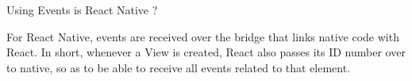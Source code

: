 Using Events is React Native ? 

For React Native, events are received over the bridge 
that links native code with React. In short, whenever a View is created, 
React also passes its ID number over to native, so as to be able to receive all 
events related to that element.